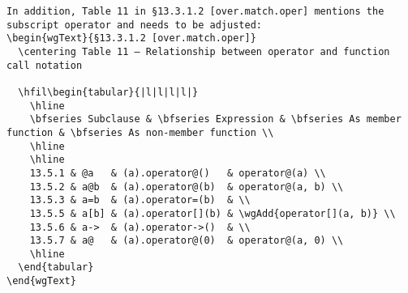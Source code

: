\begin{lstlisting}
In addition, Table 11 in §13.3.1.2 [over.match.oper] mentions the subscript operator and needs to be adjusted:
\begin{wgText}{§13.3.1.2 [over.match.oper]}
  \centering Table 11 — Relationship between operator and function call notation

  \hfil\begin{tabular}{|l|l|l|l|}
    \hline
    \bfseries Subclause & \bfseries Expression & \bfseries As member function & \bfseries As non-member function \\
    \hline
    \hline
    13.5.1 & @a   & (a).operator@()   & operator@(a) \\
    13.5.2 & a@b  & (a).operator@(b)  & operator@(a, b) \\
    13.5.3 & a=b  & (a).operator=(b)  & \\
    13.5.5 & a[b] & (a).operator[](b) & \wgAdd{operator[](a, b)} \\
    13.5.6 & a->  & (a).operator->()  & \\
    13.5.7 & a@   & (a).operator@(0)  & operator@(a, 0) \\
    \hline
  \end{tabular}
\end{wgText}


\end{lstlisting}
